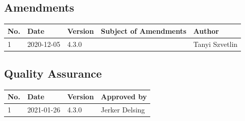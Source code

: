 \documentclass[a4paper]{arrowhead}
\begin{document}
\subsection{Amendments}

\noindent\begin{tabularx}{\textwidth}{| p{1cm} | p{3cm} | p{2cm} | X | p{4cm} |} \hline
\rowcolor{gray!33} No. & Date & Version & Subject of Amendments & Author \\ \hline

1 & 2020-12-05 & 4.3.0 &  & Tanyi Szvetlin \\ \hline


\end{tabularx}

\subsection{Quality Assurance}

\noindent\begin{tabularx}{\textwidth}{| p{1cm} | p{3cm} | p{2cm} | X |} \hline
\rowcolor{gray!33} No. & Date & Version & Approved by \\ \hline

1 & 2021-01-26  & 4.3.0 & Jerker Delsing\\ \hline


\end{tabularx}
\end{document}
